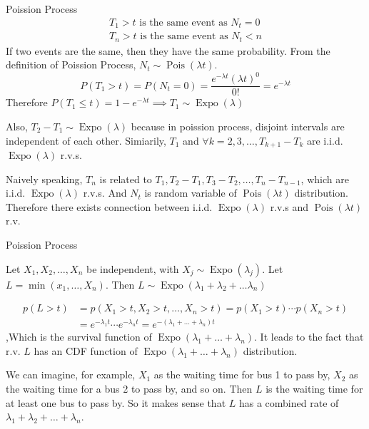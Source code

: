 \documentclass[8pt]{beamer}
\newcommand{\mypois}[1]{\operatorname{Pois}(#1)}
\newcommand{\myexpo}[1]{\operatorname{Expo}\!\left(#1\right)}
\begin{document}
\begin{frame}{Poission Process}
    \[
    \begin{gathered}
        T_1>t \text{ is the same event as } N_t =0 \\
        T_n >t \text{ is the same event as } N_t < n
    \end{gathered}
    \]
    If two events are the same, then they have the same probability. From the definition of Poission Process, $N_t \sim \mypois{\lambda t}$. 
    \[
    P(T_1 > t) = P(N_t = 0) = \frac{e^{-\lambda t}(\lambda t)^0}{0!} = e^{-\lambda t}
    \]
    Therefore $P(T_1 \leq t) = 1 - e^{-\lambda t} \implies T_1 \sim \myexpo{\lambda}$

    Also, $T_2 - T_1 \sim \myexpo{\lambda}$ because in poission process, disjoint intervals are independent of each other. Simiarily, $T_1$ and $\forall k=2,3,\dots, T_{k+1} - T_{k}$ are i.i.d. $\myexpo{\lambda}$ r.v.s.

    Naively speaking, $T_n$ is related to $T_1, T_2 - T_1, T_3 - T_2, \dots, T_n -T_{n-1}$, which are i.i.d. $\myexpo{\lambda}$ r.v.s. And $N_t$ is random variable of $\mypois{\lambda t}$ distribution. Therefore there exists connection between i.i.d. $\myexpo{\lambda}$ r.v.s and $\mypois{\lambda t}$ r.v.
\end{frame}

\begin{frame}{Poission Process}
    \begin{example}
        Let $X_1, X_2, \dots, X_n$ be independent, with $X_j \sim \myexpo{\lambda_j}$. Let $L = \min{(x_1, \dots, X_n)}$. Then $L \sim \myexpo{\lambda_1 + \lambda_2 + \dots \lambda_n}$
    \end{example}
    \[
    \begin{aligned}
        p(L > t) &= p(X_1 >t, X_2 > t, \dots, X_n>t) = p(X_1>t)\cdots p(X_n>t) \\
        &= e^{-\lambda_1 t} \cdots e^{-\lambda_n t} = e^{-(\lambda_1 + \dots + \lambda_n) t}
    \end{aligned}
    \]
    ,Which is the survival function of $\myexpo{\lambda_1 + \dots + \lambda_n}$. It leads to the fact that r.v. $L$ has an CDF function of $\myexpo{\lambda_1 + \dots + \lambda_n}$ distribution.

    \bigskip
    We can imagine, for example, $X_1$ as the waiting time for bus 1 to pass by, $X_2$ as the waiting time for a bus 2 to pass by, and so on. Then $L$ is the waiting time for at least one bus to pass by. So it makes sense that $L$ has a combined rate of $\lambda_1 + \lambda_2 + \dots + \lambda_n$.
\end{frame}
\end{document}
